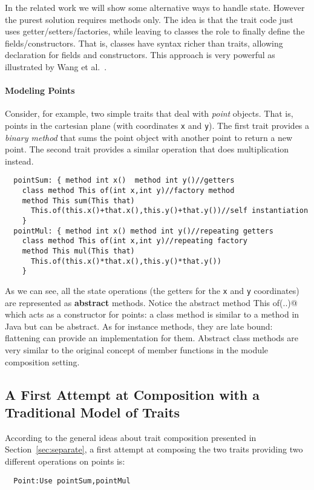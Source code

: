 In the related work we will show some alternative ways to handle
state.  However the purest solution requires methods only. The idea is
that the trait code just uses getter/setters/factories, while leaving
to classes the role to finally define the fields/constructors. That
is, classes have syntax richer than traits, allowing
declaration for fields and constructors.  This approach is very
powerful as illustrated by Wang et al.~\cite{wang2016classless}.

\paragraph{Modeling Points} Consider, for example, two simple 
traits that deal with \emph{point} objects. That is, points
in the cartesian plane (with coordinates \lstinline{x} and
\lstinline{y}). The first trait provides a \emph{binary method} that 
sums the point object with another point to return a new point. 
The second trait provides a similar operation that does multiplication 
instead.
\saveSpace 
\begin{lstlisting}
  pointSum: { method int x()  method int y()//getters
    class method This of(int x,int y)//factory method
    method This sum(This that)
      This.of(this.x()+that.x(),this.y()+that.y())//self instantiation
    }
  pointMul: { method int x() method int y()//repeating getters
    class method This of(int x,int y)//repeating factory
    method This mul(This that)
      This.of(this.x()*that.x(),this.y()*that.y())
    }
\end{lstlisting}
\saveSpace
\noindent As we can see, all the state operations (the getters for the 
\lstinline{x} and \lstinline{y} coordinates) are represented as {\bf abstract} methods.
Notice the abstract \Q@class method This of(..)@ which acts as a constructor
for points:
a class method is similar to a \Q@static@ method in Java but can be abstract. 
As for instance methods, they are late bound:  flattening can provide an implementation for them.
Abstract class methods are very similar to the original concept of member functions in the module composition setting.

\subsection{A First Attempt at Composition with a Traditional Model of
Traits}
According to the general ideas about trait composition presented in
Section~\ref{sec:separate}, a first attempt at composing the two traits providing
two different operations on points is:
\saveSpace\begin{lstlisting}
  Point:Use pointSum,pointMul
\end{lstlisting}  \saveSpace

